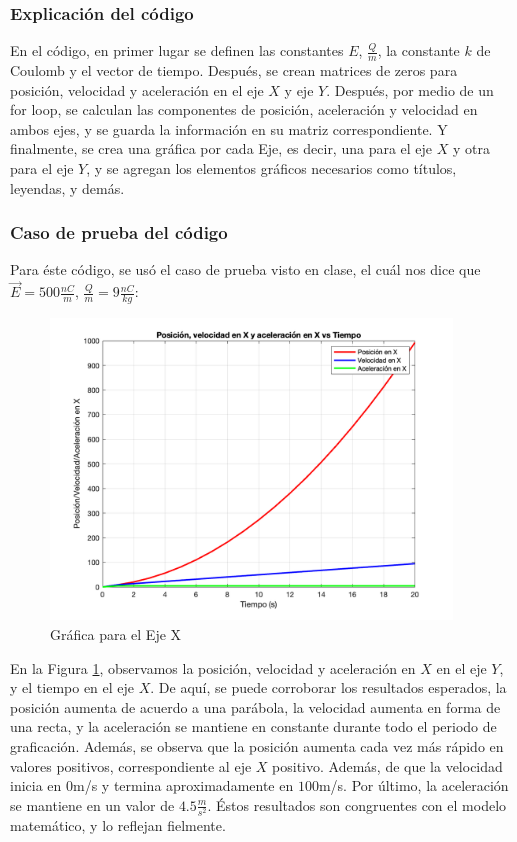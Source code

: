 \documentclass[12pt, letterpaper]{report}
\begin{document}
\subsubsection*{Explicación del código}
En el código, en primer lugar se definen las constantes $E$, $\frac{Q}{m}$, la constante $k$ de Coulomb y el vector de tiempo. Después, 
se crean matrices de zeros para posición, velocidad y aceleración en el eje $X$ y eje $Y$. Después, por medio de un for loop, se calculan las componentes 
de posición, aceleración y velocidad en ambos ejes, y se guarda la información en su matriz correspondiente. Y finalmente, se crea una gráfica por cada Eje, es decir, 
una para el eje $X$ y otra para el eje $Y$, y se agregan los elementos gráficos necesarios como títulos, leyendas, y demás. 
\subsubsection*{Caso de prueba del código}
Para éste código, se usó el caso de prueba visto en clase, el cuál nos dice que $\vec{E} = 500 \frac{nC}{m}$, $\frac{Q}{m} = 9 \frac{nC}{kg}$: 
\begin{figure}[H]
    \centering
    \includegraphics[height = 8cm]{2024-04-17_Grafica1_SeparacionMinerales.png}
    \caption{Gráfica para el Eje X}
    \label{fig:fig2}
\end{figure}
En la Figura \ref{fig:fig2}, observamos la posición, velocidad y aceleración en $X$ en el eje $Y$, y el tiempo en el eje $X$. De aquí, se puede corroborar los resultados esperados, 
la posición aumenta de acuerdo a una parábola, la velocidad aumenta en forma de una recta, y la aceleración se mantiene en constante durante todo el periodo de graficación. Además, se observa que la posición aumenta cada vez más 
rápido en valores positivos, correspondiente al eje $X$ positivo. Además, de que la velocidad inicia en $0$m/s y termina aproximadamente en $100$m/s. Por último, la aceleración se mantiene 
en un valor de $4.5\frac{m}{s^2}$. Éstos resultados son congruentes con el modelo matemático, y lo reflejan fielmente. \\
\end{document}

